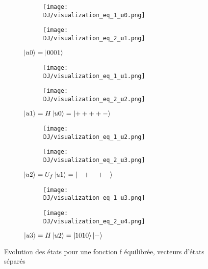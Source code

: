 \begin{figure}[ht]
  \centering
  \begin{subfigure}{0.65\textwidth}
    \centering
    \begin{subfigure}[b]{0.6\textwidth}
      \centering
      \texttt{[image: DJ/visualization\_eq\_1\_u0.png]}
    \end{subfigure}
    \begin{subfigure}[b]{0.23\textwidth}
      \centering
      \texttt{[image: DJ/visualization\_eq\_2\_u1.png]}
    \end{subfigure}
    \caption{$\ket{u0}=\ket{0001}$}
  \end{subfigure}

  \begin{subfigure}{0.65\textwidth}
    \centering
    \begin{subfigure}[b]{0.6\textwidth}
      \centering
      \texttt{[image: DJ/visualization\_eq\_1\_u1.png]}
    \end{subfigure}
    \begin{subfigure}[b]{0.23\textwidth}
      \centering
      \texttt{[image: DJ/visualization\_eq\_2\_u2.png]}
    \end{subfigure}
    \caption{$\ket{u1} = H\ket{u0} = \ket{++++-}$}
  \end{subfigure}

  \begin{subfigure}{0.65\textwidth}
    \centering
    \begin{subfigure}[b]{0.6\textwidth}
      \centering
      \texttt{[image: DJ/visualization\_eq\_1\_u2.png]}
    \end{subfigure}
    \begin{subfigure}[b]{0.23\textwidth}
      \centering
      \texttt{[image: DJ/visualization\_eq\_2\_u3.png]}
    \end{subfigure}
    \caption{$\ket{u2} = U_f\ket{u1} = \ket{-+-+-}$}
  \end{subfigure}

  \begin{subfigure}{0.65\textwidth}
    \centering
    \begin{subfigure}[b]{0.6\textwidth}
      \centering
      \texttt{[image: DJ/visualization\_eq\_1\_u3.png]}
    \end{subfigure}
    \begin{subfigure}[b]{0.23\textwidth}
      \centering
      \texttt{[image: DJ/visualization\_eq\_2\_u4.png]}
    \end{subfigure}
    \caption{$\ket{u3}=H\ket{u2} = \ket{1010}\ket{-}$}
  \end{subfigure}
  \caption{Evolution des états pour une fonction f équilibrée, vecteurs d'états séparés}
\end{figure}

